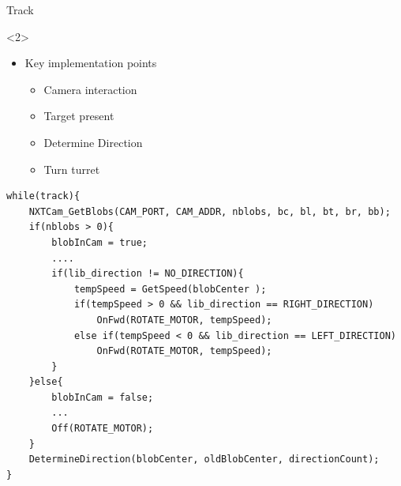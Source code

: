 \begin{frame}[fragile]{Track}
\begin{onlyenv}<2>
\begin{itemize}
  \item Key implementation points
  	\begin{itemize}
  		\item Camera interaction
  		\item Target present
  		\item Determine Direction
  		\item Turn turret 
	\end{itemize}
\end{itemize}
\begin{center}
\begin{minipage}[H]{0.9\linewidth}
\begin{lstlisting}
while(track){
	NXTCam_GetBlobs(CAM_PORT, CAM_ADDR, nblobs, bc, bl, bt, br, bb);
    if(nblobs > 0){
    	blobInCam = true;
        ....
        if(lib_direction != NO_DIRECTION){
        	tempSpeed = GetSpeed(blobCenter );
            if(tempSpeed > 0 && lib_direction == RIGHT_DIRECTION)
            	OnFwd(ROTATE_MOTOR, tempSpeed);
            else if(tempSpeed < 0 && lib_direction == LEFT_DIRECTION)
            	OnFwd(ROTATE_MOTOR, tempSpeed);
        }
	}else{
    	blobInCam = false;
        ...
    	Off(ROTATE_MOTOR);
	}
    DetermineDirection(blobCenter, oldBlobCenter, directionCount);
}
\end{lstlisting} 
\end{minipage}
\end{center}
\end{onlyenv}
\end{frame}

